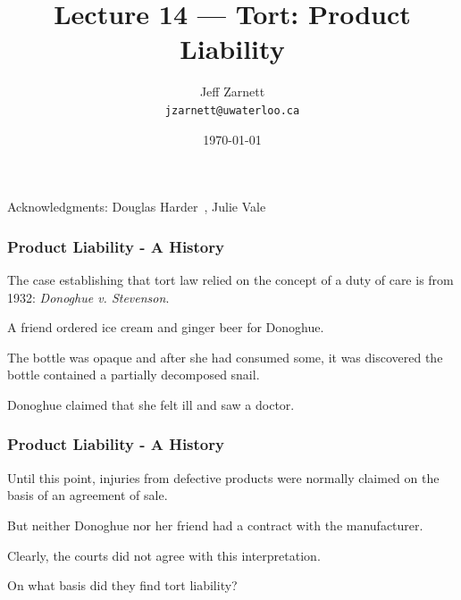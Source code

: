 

\title{Lecture 14 --- Tort: Product Liability }

\author{Jeff Zarnett \\ \small \texttt{jzarnett@uwaterloo.ca}}
\date{\today}




\begin{frame}
  \titlepage

\begin{center}
  \small{Acknowledgments: Douglas Harder~\cite{dwh}, Julie Vale~\cite{jv}}
  \end{center}
\end{frame}




\begin{frame}
\frametitle{Product Liability - A History}

The case establishing that tort law relied on the concept of a duty of care is from 1932: \textit{Donoghue v. Stevenson}.

A friend ordered ice cream and ginger beer for Donoghue.

The bottle was opaque and after she had consumed some, it was discovered the bottle contained a partially decomposed snail.

Donoghue claimed that she felt ill and saw a doctor.

\end{frame}



\begin{frame}
\frametitle{Product Liability - A History}

Until this point, injuries from defective products were normally claimed on the basis of an agreement of sale. 

But neither Donoghue nor her friend had a contract with the manufacturer.

Clearly, the courts did not agree with this interpretation.

On what basis did they find tort liability?


\end{frame}




